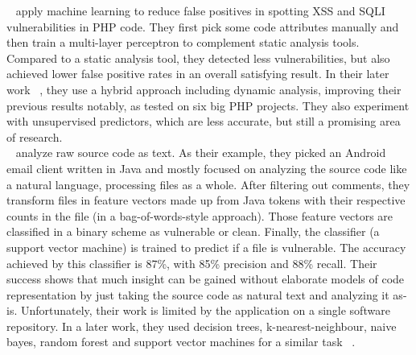 \documentclass[
a4paper,
pagesize,
pdftex,
12pt,
twoside, %
BCOR=5mm, %
ngerman,
fleqn,
final,
]{scrartcl}
\begin{document}
	~\cite{Shar.2013b} apply machine learning to reduce false positives in spotting XSS and SQLI vulnerabilities in PHP code. They first pick some code attributes manually and then train a multi-layer perceptron to complement static analysis tools. Compared to a static analysis tool, they detected less vulnerabilities, but also achieved lower false positive rates in an overall satisfying result. In their later work ~\cite{Shar.2013}, they use a hybrid approach including dynamic analysis, improving their previous results notably, as tested on six big PHP projects. They also experiment with unsupervised predictors, which are less accurate, but still a promising area of research. \\
	~\cite{Hovsepyan.2012} analyze raw source code as text. As their example, they picked an Android email client written in Java and mostly focused on analyzing the source code like a natural language, processing files as a whole. After filtering out comments, they transform files in feature vectors made up from Java tokens with their respective counts in the file (in a bag-of-words-style approach). Those feature vectors are classified in a binary scheme as vulnerable or clean. Finally, the classifier (a support vector machine) is trained to predict if a file is vulnerable. The accuracy achieved by this classifier is 87\%, with 85\% precision and 88\% recall. Their success shows that much insight can be gained without elaborate models of code representation by just taking the source code as natural text and analyzing it as-is. Unfortunately, their work is limited by the application on a single software repository. In a later work, they used decision trees, k-nearest-neighbour, naive bayes, random forest and support vector machines for a similar task ~\cite{Scandariato.2014}.\\
	
\end{document}
